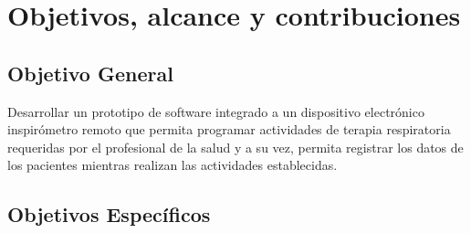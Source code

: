 \documentclass[12pt]{article}
\begin{document}
\newpage

\listoffigures

\newpage




\newpage












\section{Objetivos, alcance y contribuciones}

\subsection*{Objetivo General}

Desarrollar un prototipo de software integrado a un dispositivo electr\'onico inspir\'ometro remoto que permita programar actividades de terapia respiratoria requeridas por el profesional de la salud y a su vez, permita registrar los datos de los pacientes mientras realizan las actividades establecidas.

\subsection{Objetivos Específicos}
\label{objetivoses}
\end{document}
